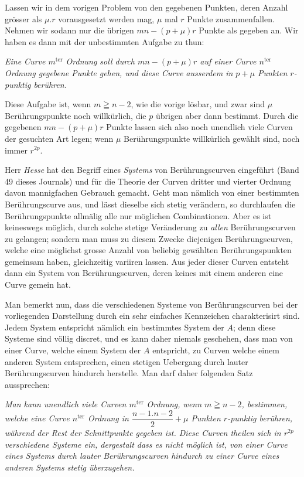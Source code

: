 \documentclass{article}
\begin{document}
Lassen wir in dem vorigen Problem von den gegebenen Punkten, deren Anzahl grösser als $\mu.r$ vorausgesetzt werden mag, $\mu$ mal $r$ Punkte zusammenfallen. Nehmen wir sodann nur die übrigen $mn - (p+\mu)r$ Punkte als gegeben an. Wir haben es dann mit der unbestimmten Aufgabe zu thun:

\emph{Eine Curve $m^{\text{ter}}$ Ordnung soll durch $mn - (p+\mu)r$ auf einer Curve $n^{\text{ter}}$ Ordnung gegebene Punkte gehen, und diese Curve ausserdem in $p+\mu$ Punkten $r$-punktig berühren.}

Diese Aufgabe ist, wenn $m \geqq n-2$, wie die vorige lösbar, und zwar sind $\mu$ Berührungspunkte noch willkürlich, die $p$ übrigen aber dann bestimmt. Durch die gegebenen $mn - (p+\mu)r$ Punkte lassen sich also noch unendlich viele Curven der gesuchten Art legen; wenn $\mu$ Berührungspunkte willkürlich gewählt sind, noch immer $r^{2p}$.

Herr \emph{Hesse} hat den Begriff eines \emph{Systems} von Berührungscurven eingeführt (Band 49 dieses Journals) und für die Theorie der Curven dritter und vierter Ordnung davon mannigfachen Gebrauch gemacht. Geht man nämlich von einer bestimmten Berührungscurve aus, und lässt dieselbe sich stetig verändern, so durchlaufen die Berührungspunkte allmälig alle nur möglichen Combinationen. Aber es ist keineswegs möglich, durch solche stetige Veränderung zu \emph{allen} Berührungscurven zu gelangen; sondern man muss zu diesem Zwecke diejenigen Berührungscurven, welche eine möglichst grosse Anzahl von beliebig gewählten Berührungspunkten gemeinsam haben, gleichzeitig variiren lassen. Aus jeder dieser Curven entsteht dann ein System von Berührungscurven, deren keines mit einem anderen eine Curve gemein hat.

Man bemerkt nun, dass die verschiedenen Systeme von Berührungscurven bei der vorliegenden Darstellung durch ein sehr einfaches Kennzeichen charakterisirt sind. Jedem System entspricht nämlich ein bestimmtes System der $A$; denn diese Systeme sind völlig discret, und es kann daher niemals geschehen, dass man von einer Curve, welche einem System der $A$ entspricht, zu Curven welche einem anderen System entsprechen, einen stetigen Uebergang durch lauter Berührungscurven hindurch herstelle. Man darf daher folgenden Satz aussprechen:

\emph{Man kann unendlich viele Curven $m^{\text{ter}}$ Ordnung, wenn $m \geqq n-2$, bestimmen, welche eine Curve $n^{\text{ter}}$ Ordnung in $\dfrac{n-1.n-2}{2} + \mu$ Punkten $r$-punktig berühren, während der Rest der Schnittpunkte gegeben ist. Diese Curven theilen sich in $r^{2p}$ verschiedene Systeme ein, dergestalt dass es nicht möglich ist, von einer Curve eines Systems durch lauter Berührungscurven hindurch zu einer Curve eines anderen Systems stetig überzugehen.}
\end{document}
